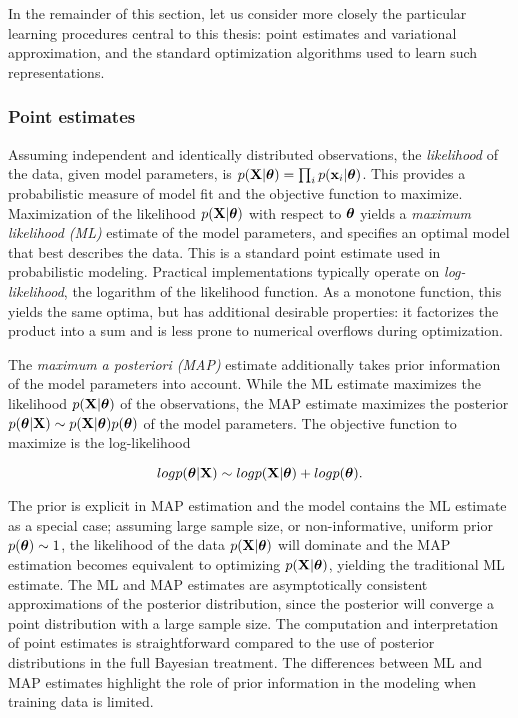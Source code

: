 In the remainder of this section, let us consider more closely the
particular learning procedures central to this thesis: point estimates
and variational approximation, and the standard optimization
algorithms used to learn such representations.

\subsubsection{Point estimates}\label{sec:point}

Assuming independent and identically distributed observations, the
{\it likelihood} of the data, given model parameters, is \(p(\mathbf{X}|\boldsymbol{\theta})
= \prod_i p(\mathbf{x}_i|\boldsymbol{\theta})\). This provides a probabilistic measure of
model fit and the objective function to maximize.  Maximization of the
likelihood \(p(\mathbf{X}|\boldsymbol{\theta})\) with respect to \(\boldsymbol{\theta}\) yields a {\it
  maximum likelihood (ML)} estimate of the model parameters, and
specifies an optimal model that best describes the data. This is a
standard point estimate used in probabilistic modeling. Practical
implementations typically operate on {\it log-likelihood}, the
logarithm of the likelihood function. As a monotone function, this
yields the same optima, but has additional desirable properties: it
factorizes the product into a sum and is less prone to numerical
overflows during optimization.

The {\it maximum a posteriori (MAP)} estimate additionally takes prior
information of the model parameters into account. While the ML
estimate maximizes the likelihood \(p(\mathbf{X}|\boldsymbol{\theta})\) of the observations,
the MAP estimate maximizes the posterior \(p(\boldsymbol{\theta}|\mathbf{X}) \sim
p(\mathbf{X}|\boldsymbol{\theta})p(\boldsymbol{\theta})\) of the model parameters. The objective function to
maximize is the log-likelihood

\begin{equation}\label{eq:map}
  log p(\boldsymbol{\theta}|\mathbf{X}) \sim log p(\mathbf{X}|\boldsymbol{\theta}) + log p(\boldsymbol{\theta}).
\end{equation}

The prior is explicit in MAP estimation and the model contains the ML
estimate as a special case; assuming large sample size, or
non-informative, uniform prior $p(\boldsymbol{\theta}) \sim 1$, the likelihood of the
data \(p(\mathbf{X}|\boldsymbol{\theta})\) will dominate and the MAP estimation becomes
equivalent to optimizing \(p(\mathbf{X}|\boldsymbol{\theta})\), yielding the traditional ML
estimate. The ML and MAP estimates are asymptotically consistent
approximations of the posterior distribution, since the posterior will
converge a point distribution with a large sample size. The
computation and interpretation of point estimates is straightforward
compared to the use of posterior distributions in the full Bayesian
treatment. The differences between ML and MAP estimates highlight the
role of prior information in the modeling when training data is
limited.

